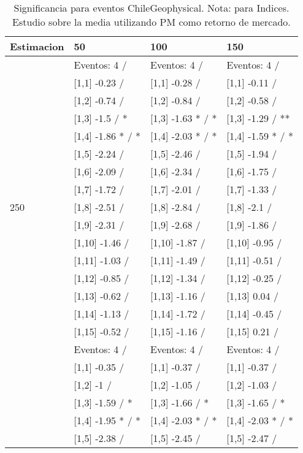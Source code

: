 \begin{table}

\caption{Significancia para eventos ChileGeophysical. Nota: para Indices. Estudio sobre la media utilizando PM como retorno de mercado.}
\centering
\begin{tabular}[t]{llll}
\toprule
Estimacion & 50 & 100 & 150\\
\midrule
 & Eventos:  4 / & Eventos:  4 / & Eventos:  4 /\\
 & {}[1,1] -0.23  / & {}[1,1] -0.28  / & {}[1,1] -0.11  /\\
 & {}[1,2] -0.74  / & {}[1,2] -0.84  / & {}[1,2] -0.58  /\\
 & {}[1,3] -1.5  / * & {}[1,3] -1.63 * / * & {}[1,3] -1.29  / **\\
 & {}[1,4] -1.86 * / * & {}[1,4] -2.03 * / * & {}[1,4] -1.59 * / *\\
\addlinespace
 & {}[1,5] -2.24  / & {}[1,5] -2.46  / & {}[1,5] -1.94  /\\
 & {}[1,6] -2.09  / & {}[1,6] -2.34  / & {}[1,6] -1.75  /\\
 & {}[1,7] -1.72  / & {}[1,7] -2.01  / & {}[1,7] -1.33  /\\
250 & {}[1,8] -2.51  / & {}[1,8] -2.84  / & {}[1,8] -2.1  /\\
 & {}[1,9] -2.31  / & {}[1,9] -2.68  / & {}[1,9] -1.86  /\\
\addlinespace
 & {}[1,10] -1.46  / & {}[1,10] -1.87  / & {}[1,10] -0.95  /\\
 & {}[1,11] -1.03  / & {}[1,11] -1.49  / & {}[1,11] -0.51  /\\
 & {}[1,12] -0.85  / & {}[1,12] -1.34  / & {}[1,12] -0.25  /\\
 & {}[1,13] -0.62  / & {}[1,13] -1.16  / & {}[1,13] 0.04  /\\
 & {}[1,14] -1.13  / & {}[1,14] -1.72  / & {}[1,14] -0.45  /\\
\addlinespace
 & {}[1,15] -0.52  / & {}[1,15] -1.16  / & {}[1,15] 0.21  /\\
 & Eventos:  4 / & Eventos:  4 / & Eventos:  4 /\\
 & {}[1,1] -0.35  / & {}[1,1] -0.37  / & {}[1,1] -0.37  /\\
 & {}[1,2] -1  / & {}[1,2] -1.05  / & {}[1,2] -1.03  /\\
 & {}[1,3] -1.59  / * & {}[1,3] -1.66  / * & {}[1,3] -1.65  / *\\
\addlinespace
 & {}[1,4] -1.95 * / * & {}[1,4] -2.03 * / * & {}[1,4] -2.03 * / *\\
 & {}[1,5] -2.38  / & {}[1,5] -2.45  / & {}[1,5] -2.47  /\\

\end{tabular}
\end{table}

